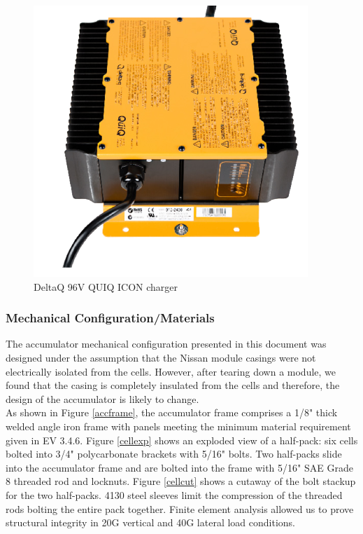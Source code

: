 \documentclass{article}
\begin{document}
            
            \begin{figure}[H]
                \centering
                \includegraphics[width = 0.5 \textwidth]{chargepic}
                \caption{DeltaQ 96V QUIQ ICON charger}
                \label{chargepic}
            \end{figure}
            
        \subsubsection{Mechanical Configuration/Materials}


            The accumulator mechanical configuration presented in this document was designed under the assumption that the Nissan module casings were not electrically isolated from the cells. However, after tearing down a module, we found that the casing is completely insulated from the cells and therefore, the design of the accumulator is likely to change.\\
            
            As shown in Figure \ref{accframe}, the accumulator frame comprises a 1/8" thick welded angle iron frame with panels meeting the minimum material requirement given in EV 3.4.6. Figure \ref{cellexp} shows an exploded view of a half-pack: six cells bolted into 3/4" polycarbonate brackets with 5/16" bolts. Two half-packs slide into the accumulator frame and are bolted into the frame with 5/16" SAE Grade 8 threaded rod and locknuts. Figure \ref{cellcut} shows a cutaway of the bolt stackup for the two half-packs. 4130 steel sleeves limit the compression of the threaded rods bolting the entire pack together. Finite element analysis allowed us to prove structural integrity in 20G vertical and 40G lateral load conditions.
            
\end{document}

